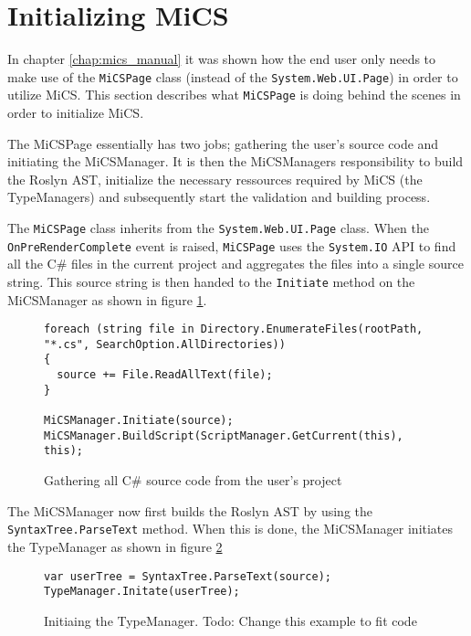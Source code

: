 \section{Initializing MiCS} %
\label{sec:initializing_mics}

In chapter \ref{chap:mics_manual} it was shown how the end user only needs to make use of the \texttt{MiCSPage} class (instead of the \texttt{System.Web.UI.Page}) in order to utilize MiCS. This section describes what \texttt{MiCSPage} is doing behind the scenes in order to initialize MiCS.

The MiCSPage essentially has two jobs; gathering the user's source code and initiating the MiCSManager. It is then the MiCSManagers responsibility to build the Roslyn AST, initialize the necessary ressources required by MiCS (the TypeManagers) and subsequently start the validation and building process.

The \texttt{MiCSPage} class inherits from the \texttt{System.Web.UI.Page} class. When the \texttt{OnPreRenderComplete} event is raised, \texttt{MiCSPage} uses the \texttt{System.IO} API to find all the C\# files in the current project and aggregates the files into a single source string. This source string is then handed to the \texttt{Initiate} method on the MiCSManager as shown in figure \ref{fig:init_mics_gather_source_code}.

\begin{figure}[H]
\begin{lstlisting}[language=CSharp,classoffset=1,morekeywords={Directory,SearcOption,File,MiCSManager,ScriptManager}]
foreach (string file in Directory.EnumerateFiles(rootPath, "*.cs", SearchOption.AllDirectories))
{
  source += File.ReadAllText(file);
}

MiCSManager.Initiate(source);
MiCSManager.BuildScript(ScriptManager.GetCurrent(this), this);
\end{lstlisting}
\caption{Gathering all C\# source code from the user's project}
\label{fig:init_mics_gather_source_code}
\end{figure}

The MiCSManager now first builds the Roslyn AST by using the \texttt{SyntaxTree.ParseText} method. When this is done, the MiCSManager initiates the TypeManager as shown in figure \ref{fig:init_mics_init_typemanager}

\begin{figure}[H]
\begin{lstlisting}[language=CSharp,classoffset=1,morekeywords={TypeManager,SyntaxTree}]
var userTree = SyntaxTree.ParseText(source);
TypeManager.Initate(userTree);
\end{lstlisting}
\caption{Initiaing the TypeManager. Todo: Change this example to fit code}
\label{fig:init_mics_init_typemanager}
\end{figure}

